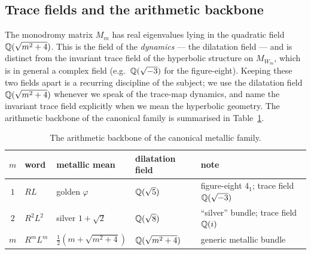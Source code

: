 \subsection{Trace fields and the arithmetic backbone}

The monodromy matrix $M_m$ has real eigenvalues lying in the quadratic field
$\mathbb{Q}(\sqrt{m^2+4})$. This is the field of the \emph{dynamics} --- the dilatation field ---
and is distinct from the invariant trace field of the hyperbolic structure on $M_{W_m}$,
which is in general a complex field (e.g.\ $\mathbb{Q}(\sqrt{-3})$ for the figure-eight). Keeping
these two fields apart is a recurring discipline of the subject; we use the dilatation
field $\mathbb{Q}(\sqrt{m^2+4})$ whenever we speak of the trace-map dynamics, and name the
invariant trace field explicitly when we mean the hyperbolic geometry. The arithmetic
backbone of the canonical family is summarised in Table~\ref{tab:fields}.

\begin{table}[h]
\centering\small
\begin{tabular}{cllll}
\toprule
$m$ & word & metallic mean & dilatation field & note \\
\midrule
$1$ & $RL$ & golden $\varphi$ & $\mathbb{Q}(\sqrt5)$ & figure-eight $4_1$; trace field $\mathbb{Q}(\sqrt{-3})$ \\
$2$ & $R^2L^2$ & silver $1+\sqrt2$ & $\mathbb{Q}(\sqrt8)$ & ``silver'' bundle; trace field $\mathbb{Q}(i)$ \\
$m$ & $R^mL^m$ & $\tfrac12(m+\sqrt{m^2+4})$ & $\mathbb{Q}(\sqrt{m^2+4})$ & generic metallic bundle \\
\bottomrule
\end{tabular}
\caption{The arithmetic backbone of the canonical metallic family. \sProved}
\label{tab:fields}
\end{table}
